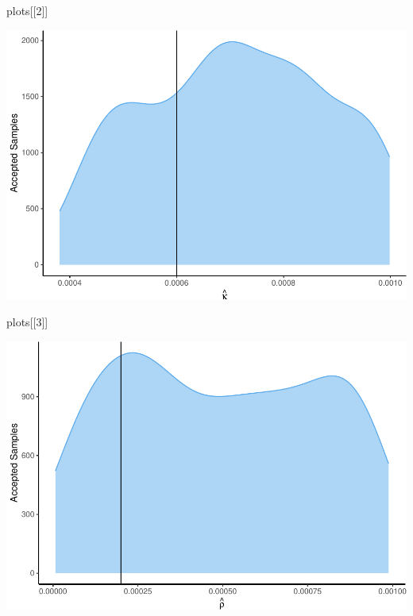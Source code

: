 \documentclass[
]{article}
\newenvironment{Shaded}{\begin{snugshade}}{\end{snugshade}}
\newcommand{\DecValTok}[1]{\textcolor[rgb]{0.00,0.00,0.81}{#1}}
\newcommand{\NormalTok}[1]{#1}
\begin{document}
\begin{Shaded}
\begin{Highlighting}[]
\NormalTok{plots[[}\DecValTok{2}\NormalTok{]]}
\end{Highlighting}
\end{Shaded}

\begin{center}\includegraphics[width=0.6\linewidth]{SC2_Report_files/figure-latex/unnamed-chunk-4-2} \end{center}

\begin{Shaded}
\begin{Highlighting}[]
\NormalTok{plots[[}\DecValTok{3}\NormalTok{]]}
\end{Highlighting}
\end{Shaded}

\begin{center}\includegraphics[width=0.6\linewidth]{SC2_Report_files/figure-latex/unnamed-chunk-4-3} \end{center}
\end{document}

